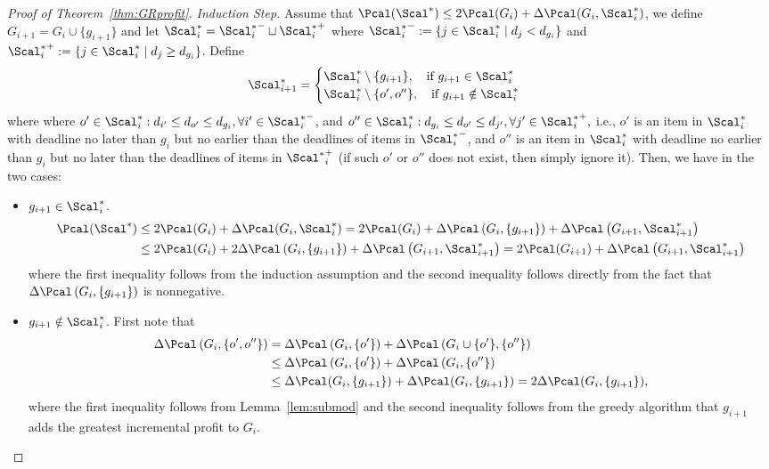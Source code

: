\begin{proof}[Proof of Theorem~\ref{thm:GRprofit}]
\emph{Induction Step.} Assume that $\Pcal(\Scal^*)\le 2\Pcal(G_i) + \Delta\Pcal(G_i,\Scal^*_i)$, we define $G_{i+1} = G_i \cup \{g_{i+1}\}$ and let $\Scal^*_i = {\Scal^*_i}^-\sqcup {\Scal^*_i}^+$ where ${\Scal^*_i}^-:=\{j\in \Scal^*_i\mid d_j<d_{g_i}\}$ and ${\Scal^*_i}^+:=\{j\in \Scal^*_i\mid d_j\ge d_{g_i}\}$. Define
\begin{align*}
\Scal^*_{i+1} = \begin{cases}
\Scal^*_i\setminus \{g_{i+1}\},\quad \text{if }g_{i+1}\in \Scal^*_i\\
\Scal^*_i\setminus \{o',o''\},\quad \text{if }g_{i+1}\notin \Scal^*_i
\end{cases}
\end{align*}
where where $o'\in\Scal^*_i: d_{i'}\le d_{o'}\le d_{g_i},\forall i'\in {\Scal^*_i}^-$, and $o''\in\Scal^*_i: d_{g_i}\le d_{o'}\le d_{j'}, \forall j'\in{\Scal^*_i}^+, $ i.e., $o'$ is an item in $\Scal^*_i$ with deadline no later than $g_i$ but no earlier than the deadlines of items in ${\Scal^*_i}^-$, and $o''$ is an item in $\Scal^*_i$ with deadline no earlier than $g_{i}$ but no later than the deadlines of items in ${\Scal^*}^+_{i}$ (if such $o'$ or $o''$ does not exist, then simply ignore it). Then, we have in the two cases:
\begin{itemize}
	\item $g_{i+1}\in\Scal^*_i$.
	\begin{align*}
	\Pcal(\Scal^*) &\le 2\Pcal(G_i) + \Delta\Pcal(G_i,\Scal^*_i)= 2\Pcal(G_i) + \Delta\Pcal\left(G_i, \left\{g_{i+1}\right\}\right) + \Delta\Pcal\left(G_{i+1},\Scal^*_{i+1}\right)\\
	&\le 2\Pcal(G_i) + 2\Delta\Pcal\left(G_i, \left\{g_{i+1}\right\}\right) + \Delta\Pcal\left(G_{i+1},\Scal^*_{i+1}\right)= 2\Pcal(G_{i+1}) + \Delta\Pcal\left(G_{i+1},\Scal^*_{i+1}\right)
	\end{align*}
	where the first inequality follows from the induction assumption and the second inequality follows directly from the fact that $\Delta\Pcal\left(G_i, \{g_{i+1}\}\right)$ is nonnegative.
	\item $g_{i+1}\notin \Scal^*_i$. First note that 
	\begin{align*}
	\Delta\Pcal\left(G_i, \left\{o',o''\right\}\right)&= \Delta\Pcal\left(G_i, \{o'\}\right) + \Delta\Pcal\left(G_i\cup\{o'\},\{o''\}\right)\\
	&\le \Delta\Pcal\left(G_i, \{o'\}\right) + \Delta\Pcal\left(G_i,\{o''\}\right)\\
	&\le \Delta\Pcal(G_i,\{g_{i+1}\}) + \Delta\Pcal(G_i,\{g_{i+1}\}) = 2\Delta\Pcal(G_i, \{g_{i+1}\}),
	\end{align*}
	where the first inequality follows from Lemma~\ref{lem:submod} and the second inequality follows from the greedy algorithm that $g_{i+1}$ adds the greatest incremental profit to $G_{i}$.
	

\end{itemize}
\end{proof}
